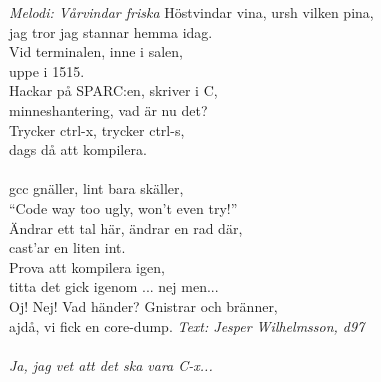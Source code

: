 {\footnotesize\textit{Melodi: Vårvindar friska}}
\vspace{10pt}
Höstvindar vina, ursh vilken pina,\\
jag tror jag stannar hemma idag.\\
Vid terminalen, inne i salen,\\
uppe i 1515.\\
Hackar på SPARC:en, skriver i C,\\
minneshantering, vad är nu det?\\
Trycker ctrl-x, trycker ctrl-s,\\
dags då att kompilera.\\
\\
gcc gnäller, lint bara skäller,\\
“Code way too ugly, won’t even try!”\\
Ändrar ett tal här, ändrar en rad där,\\
cast’ar en liten int.\\
Prova att kompilera igen,\\
titta det gick igenom ... nej men...\\
Oj! Nej! Vad händer? Gnistrar och bränner,\\
ajdå, vi fick en core-dump.
\vspace{10pt}
{\footnotesize\textit{Text: Jesper Wilhelmsson, d97\\ \\ Ja, jag vet
    att det ska vara C-x...}}
